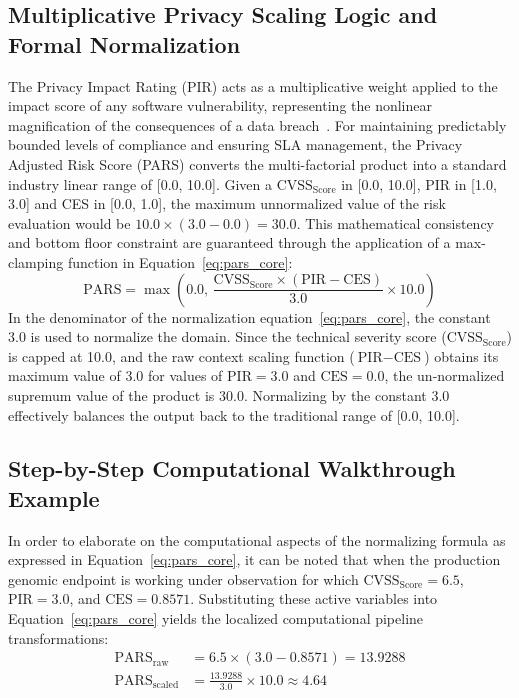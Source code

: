 \documentclass[conference,a4paper]{IEEEtran}
\begin{document}
\subsection{Multiplicative Privacy Scaling Logic and Formal Normalization}
The Privacy Impact Rating (PIR) acts as a multiplicative weight applied to the impact score of any software vulnerability, representing the nonlinear magnification of the consequences of a data breach~\cite{b6}. For maintaining predictably bounded levels of compliance and ensuring SLA management, the Privacy Adjusted Risk Score (PARS) converts the multi-factorial product into a standard industry linear range of [0.0, 10.0]. Given a $\text{CVSS}_{\text{Score}}$ in [0.0, 10.0], PIR in [1.0, 3.0] and CES in [0.0, 1.0], the maximum unnormalized value of the risk evaluation would be $10.0 \times (3.0 - 0.0) = 30.0$. This mathematical consistency and bottom floor constraint are guaranteed through the application of a max-clamping function in Equation~\eqref{eq:pars_core}:
\begin{equation}
\text{PARS} = \max\left(0.0, \, \frac{\text{CVSS}_{\text{Score}} \times (\text{PIR} - \text{CES})}{3.0} \times 10.0 \right)
\label{eq:pars_core}
\end{equation}
In the denominator of the normalization equation~\eqref{eq:pars_core}, the constant 3.0 is used to normalize the domain. Since the technical severity score ($\text{CVSS}_{\text{Score}}$) is capped at 10.0, and the raw context scaling function ($\text{PIR} - \text{CES}$) obtains its maximum value of 3.0 for values of $\text{PIR} = 3.0$ and $\text{CES} = 0.0$, the un-normalized supremum value of the product is 30.0. Normalizing by the constant 3.0 effectively balances the output back to the traditional range of [0.0, 10.0].

\subsection{Step-by-Step Computational Walkthrough Example}
In order to elaborate on the computational aspects of the normalizing formula as expressed in Equation~\eqref{eq:pars_core}, it can be noted that when the production genomic endpoint is working under observation for which $\text{CVSS}_{\text{Score}} = 6.5$, $\text{PIR} = 3.0$, and $\text{CES} = 0.8571$. Substituting these active variables into Equation~\eqref{eq:pars_core} yields the localized computational pipeline transformations:
\begin{align*}
\text{PARS}_{\text{raw}} &= 6.5 \times (3.0 - 0.8571) = 13.9288 \\
\text{PARS}_{\text{scaled}} &= \frac{13.9288}{3.0} \times 10.0 \approx \mathbf{4.64}
\end{align*}
\end{document}
